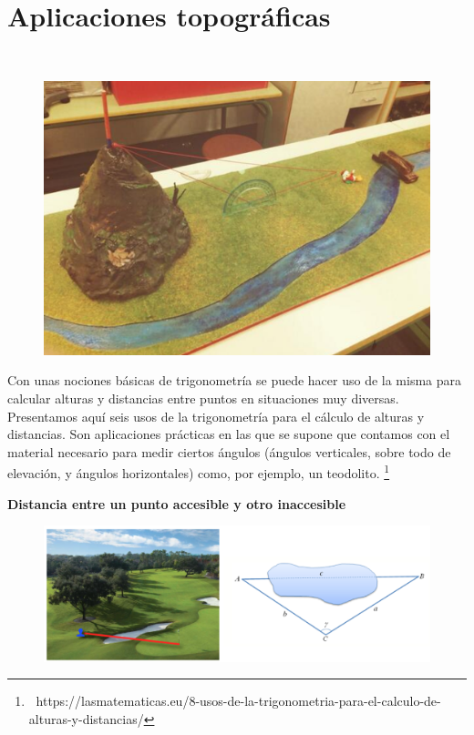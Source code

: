 \vspace{.5cm}


\begin{multicols}{2}

$\quad$
\section{Aplicaciones topográficas}

$\quad$

	

\begin{figure}[H]
	\centering
	\includegraphics[width=.4\textwidth]{img-triang/triang04.png}
\end{figure}
\end{multicols}

\begin{small}Con unas nociones básicas de trigonometría se puede hacer uso de la misma para calcular alturas y distancias entre puntos en situaciones muy diversas. Presentamos aquí seis usos de la trigonometría para el cálculo de alturas y distancias. Son aplicaciones prácticas en las que se supone que contamos con el material necesario para medir ciertos ángulos (ángulos verticales, sobre todo de elevación, y ángulos horizontales) como, por ejemplo, un teodolito. \footnote{ \textcolor{NavyBlue}{ $\ $ https://lasmatematicas.eu/8-usos-de-la-trigonometria-para-el-calculo-de-alturas-y-distancias/}}\end{small}


\vspace{5mm}

\begin{large}
\textbf{Distancia entre un punto accesible y otro inaccesible}	
\end{large}

\begin{figure}[H]
	\centering
	\includegraphics[width=.9\textwidth]{img-triang/topog01.png}
\end{figure}


